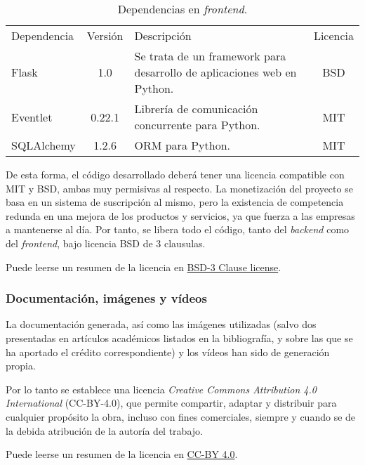 \begin{table}[H]
\begin{center}
		\begin{tabular}{l  c m{6cm}  c}\hline
			\toprule
			Dependencia & Versión & Descripción & Licencia\\
			\otoprule
			Flask & 1.0 & Se trata de un framework para desarrollo de aplicaciones web en Python.  & BSD  \\
			Eventlet & 0.22.1 & Librería de comunicación concurrente para Python.  & MIT\\
			SQLAlchemy & 1.2.6 & ORM para Python. & MIT\\
			\hline
			\bottomrule
		\end{tabular}
		\caption{Dependencias en \emph{frontend}.}
		\label{tb:licensefrontend}
		\end{center}
\end{table}

De esta forma, el código desarrollado deberá tener una licencia compatible con MIT y BSD, ambas muy permisivas al respecto. 
La monetización del proyecto se basa en un sistema de suscripción al mismo, pero la existencia de competencia redunda en una mejora de los productos y servicios, ya que fuerza a las empresas a mantenerse al día.
Por tanto, se libera todo el código, tanto del \emph{backend} como del \emph{frontend}, bajo licencia BSD de 3 clausulas.

Puede leerse un resumen de la licencia en \href{https://opensource.org/licenses/BSD-3-Clause}{BSD-3 Clause license}.

\subsubsection{Documentación, imágenes y vídeos}

La documentación generada, así como las imágenes utilizadas (salvo dos presentadas en artículos académicos listados en la bibliografía, y sobre las que se ha aportado el crédito correspondiente) y los vídeos han sido de generación propia. 

Por lo tanto se establece una licencia \emph{Creative Commons Attribution 4.0 International} (CC-BY-4.0), que permite compartir, adaptar y distribuir para cualquier propósito la obra, incluso con fines comerciales, siempre y cuando se de la debida atribución de la autoría del trabajo.

Puede leerse un resumen de la licencia en \href{https://creativecommons.org/licenses/by/4.0/}{CC-BY 4.0}. 


